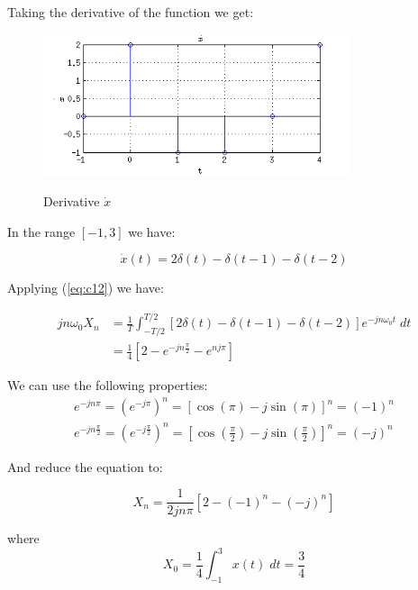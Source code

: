 \begin{enumerate}
Taking the derivative of the function we get:
\begin{figure}[H]
\caption{Derivative $\dot{x}$}
\centering
\includegraphics[width=0.8\textwidth]{figs/c1p3c1.png}
\label{fig:c1p3c1}
\end{figure}

In the range $[-1, 3]$ we have:

\begin{equation*}
\dot{x}(t) = 2 \delta(t) - \delta(t-1) - \delta(t-2)
\end{equation*} 

Applying (\ref{eq:c12}) we have:

\begin{equation*}
\begin{aligned}
j n \omega_0 X_n &= \frac{1}{T} \displaystyle\int_{- T/2}^{T/2}
	[2 \delta(t) - \delta(t-1) - \delta(t-2) ]  e^{-j n \omega_0 t} \; dt \\
&=\frac{1}{4} [2 - e^{-j n \frac{\pi}{2}} - e^{n j \pi}]
\end{aligned}
\end{equation*} 

We can use the following properties:
\begin{equation*}
\begin{aligned}
e^{-j n \pi} = (e^{-j \pi})^n = [\cos(\pi) - j \sin(\pi)]^n = (-1)^n \\
e^{-j n \frac{\pi}{2}} = (e^{-j \frac{\pi}{2}})^n 
= [\cos(\frac{\pi}{2}) - j \sin(\frac{\pi}{2})]^n = (-j)^n
\end{aligned}
\end{equation*} 

And reduce the equation to:

\begin{equation*}
X_n =\frac{1}{2 j n \pi} [2 - (-1)^n - (-j)^n]
\end{equation*} 

where 
\begin{equation*}
X_0 = \frac{1}{4} \int_{-1}^{3} x(t) \; dt = \frac{3}{4}
\end{equation*} 


\end{enumerate}
